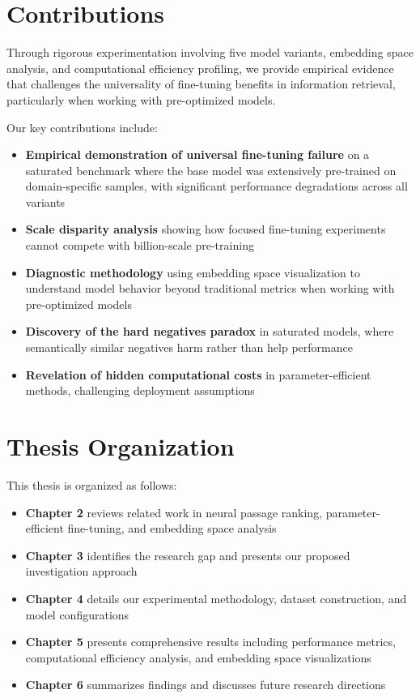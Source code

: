 \section{Contributions}

Through rigorous experimentation involving five model variants, embedding space analysis, and computational efficiency profiling, we provide empirical evidence that challenges the universality of fine-tuning benefits in information retrieval, particularly when working with pre-optimized models.

Our key contributions include:

\begin{itemize}
\item \textbf{Empirical demonstration of universal fine-tuning failure} on a saturated benchmark where the base model was extensively pre-trained on domain-specific samples, with significant performance degradations across all variants
\item \textbf{Scale disparity analysis} showing how focused fine-tuning experiments cannot compete with billion-scale pre-training
\item \textbf{Diagnostic methodology} using embedding space visualization to understand model behavior beyond traditional metrics when working with pre-optimized models
\item \textbf{Discovery of the hard negatives paradox} in saturated models, where semantically similar negatives harm rather than help performance
\item \textbf{Revelation of hidden computational costs} in parameter-efficient methods, challenging deployment assumptions
\end{itemize}

\section{Thesis Organization}

This thesis is organized as follows:

\begin{itemize}
\item \textbf{Chapter 2} reviews related work in neural passage ranking, parameter-efficient fine-tuning, and embedding space analysis
\item \textbf{Chapter 3} identifies the research gap and presents our proposed investigation approach
\item \textbf{Chapter 4} details our experimental methodology, dataset construction, and model configurations
\item \textbf{Chapter 5} presents comprehensive results including performance metrics, computational efficiency analysis, and embedding space visualizations
\item \textbf{Chapter 6} summarizes findings and discusses future research directions
\end{itemize}